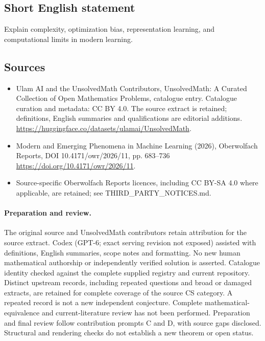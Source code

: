 \documentclass[11pt]{article}
\begin{document}
\subsection{Short English statement}
Explain complexity, optimization bias, representation learning, and computational limits in modern learning.
\subsection{Sources}
\begin{itemize}
\item[\hypertarget{source:statement:1}{S1}] Ulam AI and the UnsolvedMath Contributors, UnsolvedMath: A Curated Collection of Open Mathematics Problems, catalogue entry. Catalogue curation and metadata: CC BY 4.0. The source extract is retained; definitions, English summaries and qualifications are editorial additions.
\url{https://huggingface.co/datasets/ulamai/UnsolvedMath}.
\item[\hypertarget{source:statement:2}{S2}] Modern and Emerging Phenomena in Machine Learning (2026), Oberwolfach Reports, DOI 10.4171/owr/2026/11, pp. 683--736
\url{https://doi.org/10.4171/owr/2026/11}.
\item Source-specific Oberwolfach Reports licences, including CC BY-SA 4.0 where applicable, are retained; see THIRD\_PARTY\_NOTICES.md.
\end{itemize}
\paragraph{Preparation and review.}
The original source and UnsolvedMath contributors retain attribution for the source extract. Codex (GPT-6; exact serving revision not exposed) assisted with definitions, English summaries, scope notes and formatting. No new human mathematical authorship or independently verified solution is asserted. Catalogue identity checked against the complete supplied registry and current repository. Distinct upstream records, including repeated questions and broad or damaged extracts, are retained for complete coverage of the source CS category. A repeated record is not a new independent conjecture. Complete mathematical-equivalence and current-literature review has not been performed. Preparation and final review follow contribution prompts C and D, with source gaps disclosed. Structural and rendering checks do not establish a new theorem or open status.
\label{end:statement}
\end{document}
